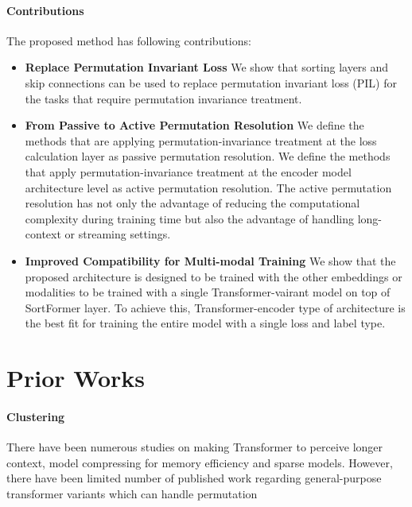 \documentclass{article}
\begin{document}
\paragraph{Contributions}
The proposed method has following contributions:
\begin{itemize}[leftmargin=*]
  \item \textbf{Replace Permutation Invariant Loss} We show that sorting layers and skip connections can be used to replace permutation invariant loss (PIL) for the tasks 
  that require permutation invariance treatment. 
  \item \textbf{From Passive to Active Permutation Resolution} We define the methods that are applying permutation-invariance treatment at the loss calculation 
  layer as passive permutation resolution. We define the methods that apply permutation-invariance treatment at the encoder model architecture level as active permutation resolution.
  The active permutation resolution has not only the advantage of reducing the computational complexity during training time but also the advantage of handling long-context or streaming settings.
  \item \textbf{Improved Compatibility for Multi-modal Training} We show that the proposed architecture is designed to be trained with the other embeddings or modalities to be trained with
  a single Transformer-vairant model on top of SortFormer layer. To achieve this, Transformer-encoder type of architecture is the best fit for training the entire model with a single loss and label type.
\end{itemize}


\section{Prior Works}

\paragraph{Clustering}
There have been numerous studies on making Transformer to perceive longer context, model compressing for memory efficiency and sparse models. However, there have been limited number of
published work regarding general-purpose transformer variants which can handle permutation
\end{document}
